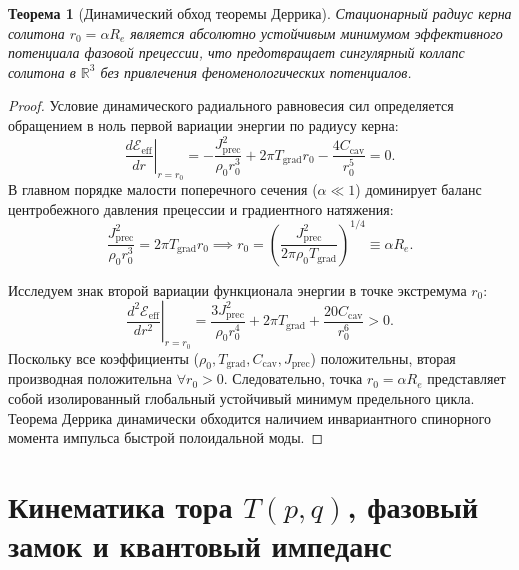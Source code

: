 \documentclass[12pt,a4paper]{article}
\newtheorem{theorem}{Теорема}
\begin{document}
	\begin{theorem}[Динамический обход теоремы Деррика]
		Стационарный радиус керна солитона $r_0 = \alpha R_e$ является абсолютно устойчивым минимумом эффективного потенциала фазовой прецессии, что предотвращает сингулярный коллапс солитона в $\mathbb{R}^3$ без привлечения феноменологических потенциалов.
	\end{theorem}
	
	\begin{proof}
		Условие динамического радиального равновесия сил определяется обращением в ноль первой вариации энергии по радиусу керна:
		\begin{equation}
			\left. \frac{d\mathcal{E}_{\text{eff}}}{dr} \right|_{r=r_0} = -\frac{J_{\text{prec}}^2}{\rho_0 r_0^3} + 2\pi T_{\text{grad}} r_0 - \frac{4 C_{\text{cav}}}{r_0^5} = 0.
		\end{equation}
		В главном порядке малости поперечного сечения ($\alpha \ll 1$) доминирует баланс центробежного давления прецессии и градиентного натяжения:
		\begin{equation}
			\frac{J_{\text{prec}}^2}{\rho_0 r_0^3} = 2\pi T_{\text{grad}} r_0 \implies r_0 = \left( \frac{J_{\text{prec}}^2}{2\pi \rho_0 T_{\text{grad}}} \right)^{1/4} \equiv \alpha R_e.
		\end{equation}
		
		Исследуем знак второй вариации функционала энергии в точке экстремума $r_0$:
		\begin{equation}
			\left. \frac{d^2\mathcal{E}_{\text{eff}}}{dr^2} \right|_{r=r_0} = \frac{3 J_{\text{prec}}^2}{\rho_0 r_0^4} + 2\pi T_{\text{grad}} + \frac{20 C_{\text{cav}}}{r_0^6} > 0.
		\end{equation}
		Поскольку все коэффициенты ($\rho_0, T_{\text{grad}}, C_{\text{cav}}, J_{\text{prec}}$) положительны, вторая производная положительна $\forall r_0 > 0$. Следовательно, точка $r_0 = \alpha R_e$ представляет собой изолированный глобальный устойчивый минимум предельного цикла. Теорема Деррика динамически обходится наличием инвариантного спинорного момента импульса быстрой полоидальной моды.
	\end{proof}
	
	\section{Кинематика тора $T(p,q)$, фазовый замок и квантовый импеданс}
	
\end{document}
